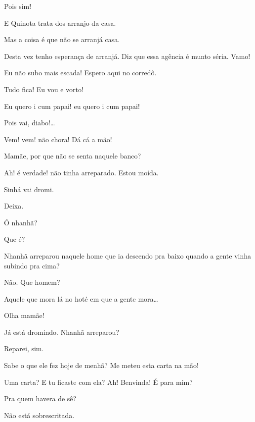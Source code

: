   Pois sim!

 E Quinota trata dos arranjo da casa.

 Mas a coisa é que não se arranjá casa.

 Desta vez tenho esperança de arranjá. Diz que essa agência é
munto séria. Vamo!

 Eu não subo mais escada! Espero aqui no corredô.

 Tudo fica! Eu vou e vorto! 

  Eu quero i cum papai! eu quero i cum
papai!

 Pois vai, diabo!\ldots{}

 Vem! vem! não chora! Dá cá a mão! 


 Mamãe, por que não se senta naquele banco?

 Ah! é verdade! não tinha arreparado. Estou moída. 

 Sinhá vai dromi.

 Deixa.

  Ó nhanhã?

 Que é?

 Nhanhã arreparou naquele home que ia descendo pra baixo quando a
gente vinha subindo pra cima?

 Não. Que homem?

 Aquele que mora lá no hoté em que a gente mora\ldots{}

 Olha mamãe! 

 Já está dromindo. Nhanhã arreparou?

 Reparei, sim.

 Sabe o que ele fez hoje de menhã? Me meteu esta carta na mão!

 Uma carta? E tu ficaste com ela? Ah! Benvinda!  É para
mim?

 Pra quem havera de sê?

 Não está sobrescritada.

